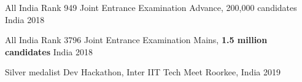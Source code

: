 



\begin{cvhonors}

  \cvhonor
    {All India Rank 949} %
    {Joint Entrance Examination Advance, 200,000 candidates} %
    {India} %
    {2018} %

  \cvhonor
    {All India Rank 3796} %
    {Joint Entrance Examination Mains, \textbf{1.5 million candidates}} %
    {India} %
    {2018} %

  \cvhonor
    {Silver medalist} %
    {Dev Hackathon, Inter IIT Tech Meet} %
    {Roorkee, India} %
    {2019} %

\end{cvhonors}

